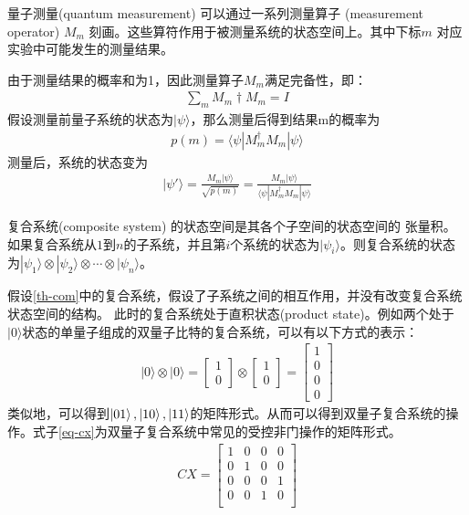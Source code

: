 \begin{theorem}\citep{nielsen2010quantum}
    量子测量(quantum measurement) 可以通过一系列测量算子 (measurement operator) ${M_m}$ 刻画。这些算符作用于被测量系统的状态空间上。其中下标$m$
   对应实验中可能发生的测量结果。
\end{theorem}
由于测量结果的概率和为1，因此测量算子${M_m}$满足完备性，即：
\begin{align}
    \sum_m M_m\dagger M_m = I
\end{align}
假设测量前量子系统的状态为\(|\psi\rangle\)，那么测量后得到结果m的概率为
\begin{align}
    p(m) = \langle\psi|M_m^\dagger M_m|\psi\rangle
\end{align}
测量后，系统的状态变为
\begin{align}
    |\psi'\rangle =  \frac{M_m|\psi\rangle}{\sqrt{p(m)}} = \frac{M_m|\psi\rangle}{\langle\psi|M_m^\dagger M_m|\psi\rangle}
\end{align}
\begin{theorem}\citep{nielsen2010quantum}
    复合系统(composite system) 的状态空间是其各个子空间的状态空间的
    张量积。如果复合系统从$1$到$n$的子系统，并且第$i$个系统的状态为$|\psi_i\rangle$。则复合系统的状态为\(|\psi_1\rangle\otimes|\psi_2\rangle\otimes\cdots\otimes |\psi_n\rangle\)。
    \label{th-com}
\end{theorem}
假设\ref{th-com}中的复合系统，假设了子系统之间的相互作用，并没有改变复合系统状态空间的结构。
此时的复合系统处于直积状态(product state)。例如两个处于\(|0\rangle\)状态的单量子组成的双量子比特的复合系统，可以有以下方式的表示：
\begin{align}
    |0\rangle\otimes|0\rangle=\left[\begin{matrix}
        1\\0
    \end{matrix}\right]\otimes\left[\begin{matrix}
        1\\0
    \end{matrix}\right] = \left[\begin{matrix}
        1\\0\\0\\0
    \end{matrix}\right]
\end{align}
类似地，可以得到\(\ket{01},\ket{10},\ket{11}\)的矩阵形式。从而可以得到双量子复合系统的操作。式子\ref{eq-cx}为双量子复合系统中常见的受控非门操作的矩阵形式。
\begin{align}
    \label{eq-cx}
    CX=\left[\begin{matrix}
        1 & 0 & 0 & 0\\
        0 & 1 & 0 & 0\\
        0 & 0 & 0 & 1\\
        0 & 0 & 1 & 0\\
    \end{matrix}\right]
\end{align}


